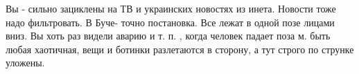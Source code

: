  
 
 
 
 


Вы - сильно зациклены на ТВ и украинских новостях из инета. Новости тоже надо
фильтровать. В Буче- точно постановка. Все лежат в одной позе лицами вниз. Вы
хоть раз видели аварию и т. п. , когда человек падает поза м. быть любая
хаотичная, вещи и ботинки разлетаются в сторону, а тут строго по струнке
уложены.
